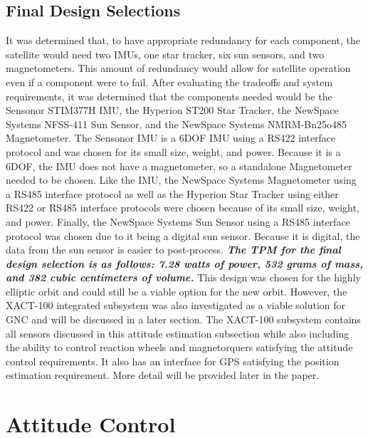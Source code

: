 \documentclass[conf]{new-aiaa}
\begin{document}
\subsection{Final Design Selections}
It was determined that, to have appropriate redundancy for each component, the satellite would need two IMUs, one star tracker, six sun sensors, and two magnetometers. This amount of redundancy would allow for satellite operation even if a component were to fail. After evaluating the tradeoffs and system requirements, it was determined that the components needed would be the Sensonor STIM377H \cite{STIM377H} IMU, the Hyperion ST200 \cite{ST-200H} Star Tracker, the NewSpace Systems NFSS-411 \cite{NFSS-411} Sun Sensor, and the NewSpace Systems NMRM-Bn25o485 \cite{NMRM-Bn25o485} Magnetometer. The Sensonor IMU is a 6DOF IMU using a RS422 interface protocol and was chosen for its small size, weight, and power. Because it is a 6DOF, the IMU does not have a magnetometer, so a standalone Magnetometer needed to be chosen. Like the IMU, the NewSpace Systems Magnetometer using a RS485 interface protocol as well as the Hyperion Star Tracker using either RS422 or RS485 interface protocols were chosen because of its small size, weight, and power. Finally, the NewSpace Systems Sun Sensor using a RS485 interface protocol was chosen due to it being a digital sun sensor. Because it is digital, the data from the sun sensor is easier to post-process. \textbf{\textit{The TPM for the final design selection is as follows: 7.28 watts of power, 532 grams of mass, and 382 cubic centimeters of volume.}} This design was chosen for the highly elliptic orbit and could still be a viable option for the new orbit. However, the XACT-100 integrated subsystem was also investigated as a viable solution for GNC and will be discussed in a later section. The XACT-100 subsystem contains all sensors discussed in this attitude estimation subsection while also including the ability to control reaction wheels and magnetorquers satisfying the attitude control requirements. It also has an interface for GPS satisfying the position estimation requirement. More detail will be provided later in the paper.


\section{Attitude Control}
\end{document}
